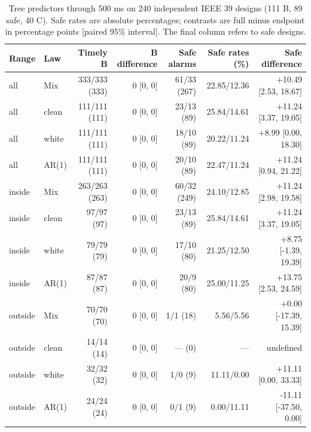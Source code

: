 \documentclass[10pt]{article}
\begin{document}
\begin{table}[htbp]\centering\small
\caption{Tree predictors through 500 ms on 240 independent IEEE 39 designs (111 B, 89 safe, 40 C). Safe rates are absolute percentages; contrasts are full minus endpoint in percentage points [paired 95\% interval]. The final column refers to safe designs.}\label{tab:r4tree}
\setlength{\tabcolsep}{3pt}
\begin{tabular}{llrrrrr}\toprule
Range & Law & Timely B & B difference & Safe alarms & Safe rates (\%) & Safe difference\\\midrule
all & Mix & 333/333 (333) & 0 [0, 0] & 61/33 (267) & 22.85/12.36 & +10.49 [2.53, 18.67] \\
all & clean & 111/111 (111) & 0 [0, 0] & 23/13 (89) & 25.84/14.61 & +11.24 [3.37, 19.05] \\
all & white & 111/111 (111) & 0 [0, 0] & 18/10 (89) & 20.22/11.24 & +8.99 [0.00, 18.30] \\
all & AR(1) & 111/111 (111) & 0 [0, 0] & 20/10 (89) & 22.47/11.24 & +11.24 [0.94, 21.22] \\
inside & Mix & 263/263 (263) & 0 [0, 0] & 60/32 (249) & 24.10/12.85 & +11.24 [2.98, 19.58] \\
inside & clean & 97/97 (97) & 0 [0, 0] & 23/13 (89) & 25.84/14.61 & +11.24 [3.37, 19.05] \\
inside & white & 79/79 (79) & 0 [0, 0] & 17/10 (80) & 21.25/12.50 & +8.75 [-1.39, 19.39] \\
inside & AR(1) & 87/87 (87) & 0 [0, 0] & 20/9 (80) & 25.00/11.25 & +13.75 [2.53, 24.59] \\
outside & Mix & 70/70 (70) & 0 [0, 0] & 1/1 (18) & 5.56/5.56 & +0.00 [-17.39, 15.39] \\
outside & clean & 14/14 (14) & 0 [0, 0] & --- (0) & --- & undefined \\
outside & white & 32/32 (32) & 0 [0, 0] & 1/0 (9) & 11.11/0.00 & +11.11 [0.00, 33.33] \\
outside & AR(1) & 24/24 (24) & 0 [0, 0] & 0/1 (9) & 0.00/11.11 & -11.11 [-37.50, 0.00] \\
\bottomrule\end{tabular}\end{table}
\end{document}
